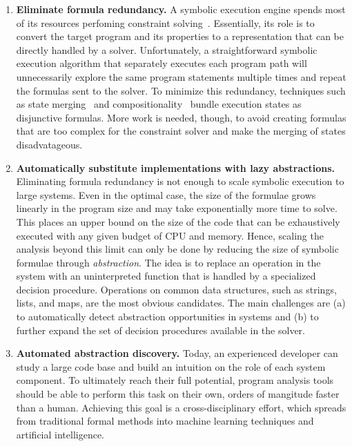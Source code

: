 \begin{enumerate}
\item \textbf{Eliminate formula redundancy.}  A symbolic execution engine spends most of its resources perfoming constraint solving~\cite{klee}.  Essentially, its role is to convert the target program and its properties to a representation that can be directly handled by a solver.
%
Unfortunately, a straightforward symbolic execution algorithm that separately executes each program path will unnecessarily explore the same program statements multiple times and repeat the formulas sent to the solver.
%
To minimize this redundancy, techniques such as state merging~\cite{state-merging} and compositionality~\cite{godefroid:compdyntest} bundle execution states as disjunctive formulas.
%
More work is needed, though, to avoid creating formulas that are too complex for the constraint solver and make the merging of states disadvatageous.


\item \textbf{Automatically substitute implementations with lazy abstractions.}  Eliminating formula redundancy is not enough to scale symbolic execution to large systems.
%
Even in the optimal case, the size of the formulae grows linearly in the program size and may take exponentially more time to solve.  This places an upper bound on the size of the code that can be exhaustively executed with any given budget of CPU and memory.
%
Hence, scaling the analysis beyond this limit can only be done by reducing the size of symbolic formulae through \emph{abstraction}.  The idea is to replace an operation in the system with an uninterpreted function that is handled by a specialized decision procedure.
%
Operations on common data structures, such as strings, lists, and maps, are the most obvious candidates.  The main challenges are (a) to automatically detect abstraction opportunities in systems and (b) to further expand the set of decision procedures available in the solver.

  
\item \textbf{Automated abstraction discovery.}  Today, an experienced developer can study a large code base and build an intuition on the role of each system component.
%
To ultimately reach their full potential, program analysis tools should be able to perform this task on their own, orders of mangitude faster than a human.
%
Achieving this goal is a cross-disciplinary effort, which spreads from traditional formal methods into machine learning techniques and artificial intelligence.
\end{enumerate}






